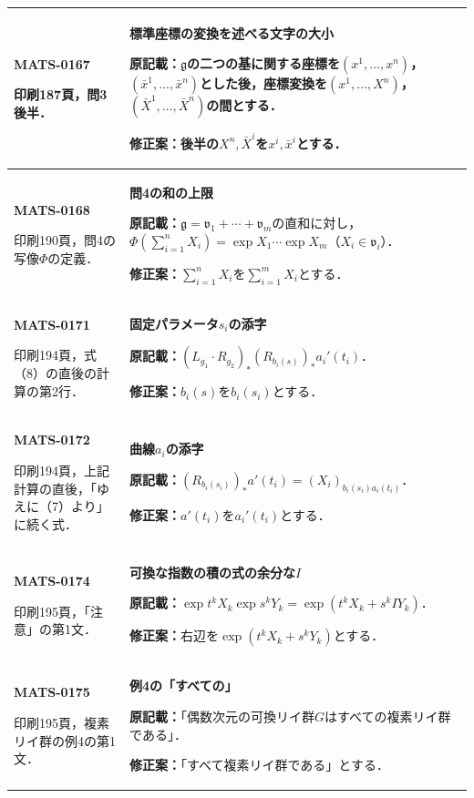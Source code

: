 \documentclass[a4paper,10pt]{ltjsarticle}
\begin{document}
\begin{longtable}{@{}>{\raggedright\arraybackslash}p{.19\linewidth}>{\raggedright\arraybackslash}p{.77\linewidth}@{}}
\hline
\hypertarget{MATS-0167}{}\textbf{MATS-0167}\par 印刷187頁，問3後半． & \textbf{標準座標の変換を述べる文字の大小}\par\textbf{原記載：}$\mathfrak g$の二つの基に関する座標を$(x^1,\ldots,x^n)$，$(\bar x^1,\ldots,\bar x^n)$とした後，座標変換を$(x^1,\ldots,X^n)$，$(\bar X^1,\ldots,\bar X^n)$の間とする．\par\textbf{修正案：}後半の$X^n,\bar X^i$を$x^i,\bar x^i$とする． \\[3pt]
\hline
\hypertarget{MATS-0168}{}\textbf{MATS-0168}\par 印刷190頁，問4の写像$\Phi$の定義． & \textbf{問4の和の上限}\par\textbf{原記載：}$\mathfrak g=\mathfrak v_1+\cdots+\mathfrak v_m$の直和に対し，$\Phi(\sum_{i=1}^nX_i)=\exp X_1\cdots\exp X_m$（$X_i\in\mathfrak v_i$）．\par\textbf{修正案：}$\sum_{i=1}^nX_i$を$\sum_{i=1}^mX_i$とする． \\[3pt]
\hline
\hypertarget{MATS-0171}{}\textbf{MATS-0171}\par 印刷194頁，式（8）の直後の計算の第2行． & \textbf{固定パラメータ$s_i$の添字}\par\textbf{原記載：}$(L_{g_1}\cdot R_{g_2})_*(R_{b_i(s)})_*a_i'(t_i)$．\par\textbf{修正案：}$b_i(s)$を$b_i(s_i)$とする． \\[3pt]
\hline
\hypertarget{MATS-0172}{}\textbf{MATS-0172}\par 印刷194頁，上記計算の直後，「ゆえに（7）より」に続く式． & \textbf{曲線$a_i$の添字}\par\textbf{原記載：}$(R_{b_i(s_i)})_*a'(t_i)=(X_i)_{b_i(s_i)a_i(t_i)}$．\par\textbf{修正案：}$a'(t_i)$を$a_i'(t_i)$とする． \\[3pt]
\hline
\hypertarget{MATS-0174}{}\textbf{MATS-0174}\par 印刷195頁，「注意」の第1文． & \textbf{可換な指数の積の式の余分な$I$}\par\textbf{原記載：}$\exp t^kX_k\exp s^kY_k=\exp(t^kX_k+s^kIY_k)$．\par\textbf{修正案：}右辺を$\exp(t^kX_k+s^kY_k)$とする． \\[3pt]
\hline
\hypertarget{MATS-0175}{}\textbf{MATS-0175}\par 印刷195頁，複素リイ群の例4の第1文． & \textbf{例4の「すべての」}\par\textbf{原記載：}「偶数次元の可換リイ群$G$はすべての複素リイ群である」．\par\textbf{修正案：}「すべて複素リイ群である」とする． \\[3pt]

\end{longtable}
\end{document}
